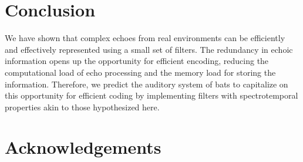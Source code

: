 \documentclass[10pt,letterpaper]{article}
\begin{document}
\section*{Conclusion}

We have shown that complex echoes from real environments can be efficiently and effectively represented using a small set of filters. The redundancy in echoic information opens up the opportunity for efficient encoding, reducing the computational load of echo processing and the memory load for storing the information. Therefore, we predict the auditory system of bats to capitalize on this opportunity for efficient coding by implementing filters with spectrotemporal properties akin to those hypothesized here.

\section*{Acknowledgements}


%
%
\end{document}
